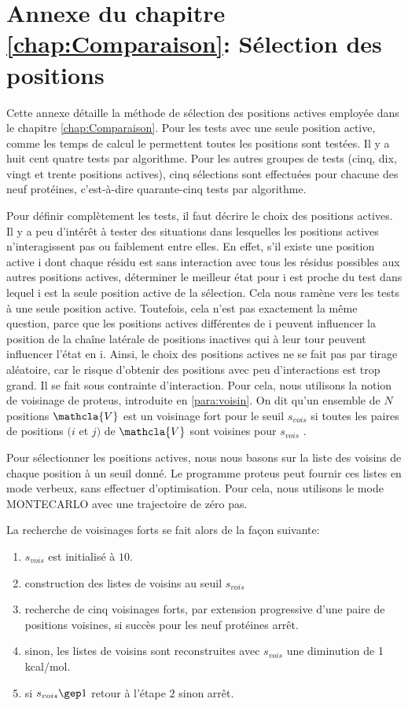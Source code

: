 \chapter*{Annexe du chapitre \ref{chap:Comparaison}: Sélection des positions }
\label{chap:annexeposi}
Cette annexe détaille la méthode de sélection des positions actives employée dans le chapitre \ref{chap:Comparaison}.
Pour les tests avec une seule position active, comme les temps de calcul le permettent toutes les positions sont testées. Il y a huit cent quatre tests par algorithme. Pour les autres groupes de tests (cinq, dix, vingt et trente positions actives), cinq sélections sont effectuées pour chacune  des neuf protéines, c'est-à-dire quarante-cinq tests par algorithme.

Pour définir complètement les tests, il faut décrire le choix des positions actives.
Il y a peu d'intérêt à tester des situations dans lesquelles les positions actives n'interagissent pas ou faiblement entre elles.
En effet, s'il existe une position active i dont chaque résidu est sans interaction avec tous les résidus possibles aux autres positions actives, déterminer le meilleur état pour i est proche du test dans lequel i est la seule position active de la sélection. Cela nous ramène vers les tests à une seule position active. Toutefois, cela n'est pas exactement la même question, parce que les positions actives différentes de i peuvent influencer la position de la chaîne latérale de positions inactives qui à leur tour peuvent influencer l'état en i. Ainsi, le choix des positions actives ne se fait pas par tirage aléatoire, car le risque d'obtenir des positions avec peu d'interactions est trop grand. Il se fait sous contrainte d'interaction. Pour cela, nous utilisons la notion de voisinage de proteus, introduite en \ref{para:voisin}. On dit qu'un ensemble de $N$ positions $\mathcla{V}$ est un \og voisinage fort \fg  pour le seuil $s_{vois}$ si toutes les paires de positions $(i$ et $j)$ de $\mathcla{V}$ sont voisines pour $s_{vois}$ .

Pour sélectionner les positions actives, nous nous basons sur la liste des voisins de chaque position à un seuil donné. Le programme proteus peut fournir ces listes en mode verbeux, sans effectuer d'optimisation. Pour cela, nous utilisons le mode MONTECARLO avec une trajectoire de zéro pas. 

La recherche de voisinages forts se fait alors de la façon suivante:

\begin{enumerate}
\item $s_{vois}$ est initialisé à $10$.
\item construction des listes de voisins au seuil $s_{vois}$  
\item recherche de cinq voisinages forts, par extension progressive d'une paire de positions voisines, si succès pour les neuf protéines arrêt.
\item sinon, les listes de voisins sont reconstruites avec $s_{vois}$  une diminution de 1 kcal/mol. 
\item si $ s_{vois} \gep 1 $ retour à l'étape 2 sinon arrêt.  
\end{enumerate}

